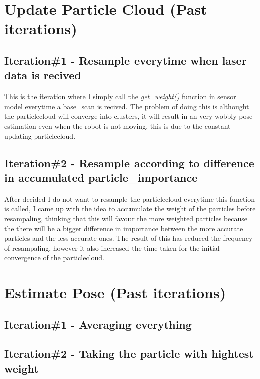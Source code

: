 \documentclass[11pt,a4paper]{article}
\begin{document}
\section{Update Particle Cloud (Past iterations)}
\label{UPC_DI}
  \subsection{Iteration\#1 - Resample everytime when laser data is recived}
  This is the iteration where I simply call the \textit{get\_weight()} function in sensor model everytime a base\_scan is recived.
  The problem of doing this is althought the particlecloud will converge into clusters,
  it will result in an very wobbly pose estimation even when the robot is not moving, this is due to the constant updating particlecloud.
  \subsection{Iteration\#2 - Resample according to difference in accumulated particle\_importance}
  After decided I do not want to resample the particlecloud everytime this function is called, I came up with the idea to accumulate the
  weight of the particles before resampaling, thinking that this will favour the more weighted particles because the there will be a bigger
  difference in importance between the more accurate particles and the less accurate ones. The result of this has reduced the frequency of resampaling,
  however it also increased the time taken for the initial convergence of the particlecloud.
\section{Estimate Pose (Past iterations)}
  \subsection{Iteration\#1 - Averaging everything}
  \subsection{Iteration\#2 - Taking the particle with hightest weight}
\end{document}
